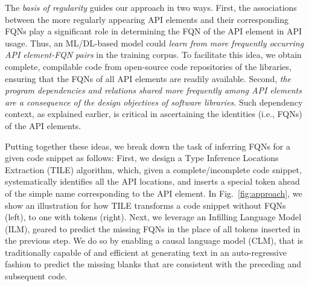 
The {\em basis of regularity} guides our approach in two ways. First, the associations between the more regularly appearing API elements and their corresponding FQNs play a significant role in determining the FQN of the API element in API usage. Thus, an ML/DL-based model could {\em learn from more frequently occurring API element-FQN pairs} in the training corpus. To facilitate this idea, we obtain complete, compilable code from open-source code repositories of the libraries, ensuring that the FQNs of all API elements are readily available. Second, {\em the program dependencies and relations shared more frequently among API elements are a consequence of the design objectives of software libraries}. Such dependency context, as explained earlier, is critical in ascertaining the identities (i.e., FQNs) of the API elements.


Putting together these ideas, we break down the task of inferring FQNs for a given code snippet as follows: First, we design a Type Inference Locations Extraction (TILE) algorithm, which, given a complete/incomplete code snippet, systematically identifies all the API locations, and inserts a special \code{[blank]} token ahead of the simple name corresponding to the API element. In Fig.~\ref{fig:approach}, we show an illustration for how TILE transforms a code snippet without FQNs (left), to one with \code{[blank]} tokens (right). Next, we leverage an Infilling Language Model~\cite{donahue-etal-2020-enabling} (ILM), geared to predict the missing FQNs in the place of all \code{[blank]} tokens inserted in the previous step. We do so by enabling a causal language model (CLM), that is traditionally capable of and efficient at generating text in an auto-regressive fashion to predict the missing blanks that are consistent with the preceding and subsequent code.



